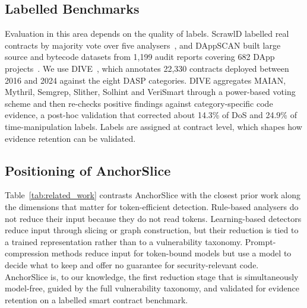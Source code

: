 \documentclass{ieeeaccess}
\begin{document}
\subsection{Labelled Benchmarks}\label{subsec:rw_bench}
Evaluation in this area depends on the quality of labels. ScrawlD labelled real contracts by majority vote over five analysers~\cite{yashavant2022}, and DAppSCAN built large source and bytecode datasets from 1,199 audit reports covering 682 DApp projects~\cite{zheng2024dappscan}. We use DIVE~\cite{dive2026}, which annotates 22,330 contracts deployed between 2016 and 2024 against the eight DASP categories. DIVE aggregates MAIAN, Mythril, Semgrep, Slither, Solhint and VeriSmart through a power-based voting scheme and then re-checks positive findings against category-specific code evidence, a post-hoc validation that corrected about 14.3\% of DoS and 24.9\% of time-manipulation labels. Labels are assigned at contract level, which shapes how evidence retention can be validated.

\subsection{Positioning of AnchorSlice}\label{subsec:rw_position}
Table~\ref{tab:related_work} contrasts AnchorSlice with the closest prior work along the dimensions that matter for token-efficient detection. Rule-based analysers do not reduce their input because they do not read tokens. Learning-based detectors reduce input through slicing or graph construction, but their reduction is tied to a trained representation rather than to a vulnerability taxonomy. Prompt-compression methods reduce input for token-bound models but use a model to decide what to keep and offer no guarantee for security-relevant code. AnchorSlice is, to our knowledge, the first reduction stage that is simultaneously model-free, guided by the full vulnerability taxonomy, and validated for evidence retention on a labelled smart contract benchmark.

\end{document}

